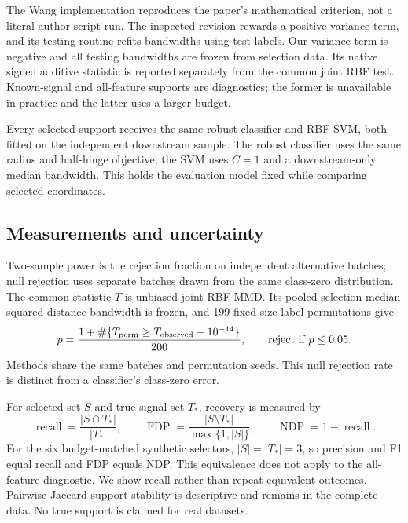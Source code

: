 \documentclass[11pt,a4paper]{article}
\begin{document}
The Wang implementation reproduces the paper's mathematical criterion, not a
literal author-script run. The inspected revision rewards a positive variance
term, and its testing routine refits bandwidths using test labels. Our variance
term is negative and all testing bandwidths are frozen from selection data.
Its native signed additive statistic is reported separately from the common
joint RBF test. Known-signal and all-feature supports are diagnostics; the former
is unavailable in practice and the latter uses a larger budget.

Every selected support receives the same robust classifier and RBF SVM, both fitted
on the independent downstream sample. The robust classifier uses the same radius
and half-hinge objective; the SVM uses $C=1$ and a downstream-only median bandwidth.
This holds the evaluation model fixed while comparing selected coordinates.

\subsection{Measurements and uncertainty}
Two-sample power is the rejection fraction on independent alternative batches;
null rejection uses separate batches drawn from the same class-zero distribution.
The common statistic $T$ is unbiased joint RBF MMD. Its pooled-selection median
squared-distance bandwidth is frozen, and 199 fixed-size label permutations give
\begin{equation}\label{eq:permutation}
p=\frac{1+\#\{T_{\rm perm}\ge T_{\rm observed}-10^{-14}\}}{200},\qquad
\text{reject if }p\le0.05.
\end{equation}
Methods share the same batches and permutation seeds. This null rejection rate
is distinct from a classifier's class-zero error.

For selected set $S$ and true signal set $T_*$, recovery is measured by
\begin{equation}\label{eq:recovery}
\operatorname{recall}=\frac{|S\cap T_*|}{|T_*|},\qquad
\operatorname{FDP}=\frac{|S\setminus T_*|}{\max\{1,|S|\}},\qquad
\operatorname{NDP}=1-\operatorname{recall}.
\end{equation}
For the six budget-matched synthetic selectors, $|S|=|T_*|=3$,
so precision and F1 equal recall and FDP equals NDP. This equivalence does
not apply to the all-feature diagnostic. We show recall rather than repeat equivalent outcomes. Pairwise
Jaccard support stability is descriptive and remains in the complete data.
No true support is claimed for real datasets.
\end{document}
